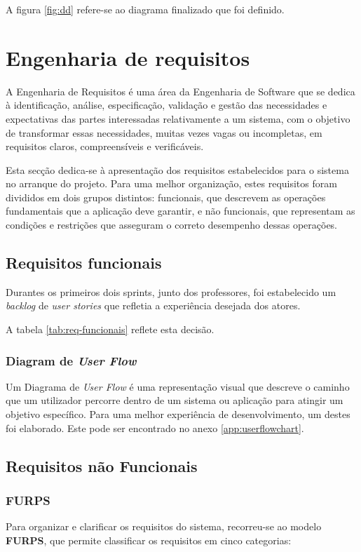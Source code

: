A figura \ref{fig:dd} refere-se ao diagrama finalizado que foi definido.

\section{Engenharia de requisitos}

A Engenharia de Requisitos é uma área da Engenharia de Software que se dedica à identificação, análise, especificação, validação e gestão das necessidades e expectativas das partes interessadas relativamente a um sistema, com o objetivo de transformar essas necessidades, muitas vezes vagas ou incompletas, em requisitos claros, compreensíveis e verificáveis.

Esta secção dedica-se à apresentação dos requisitos estabelecidos para o sistema no arranque do projeto. 
Para uma melhor organização, estes requisitos foram divididos em dois grupos distintos: funcionais, que descrevem as operações fundamentais que a aplicação deve garantir, e não funcionais, que representam as condições e restrições que asseguram o correto desempenho dessas operações.


\subsection{Requisitos funcionais}
\label{subsection:requisitos_funcionais}

Durantes os primeiros dois sprints, junto dos professores, foi estabelecido um \textit{backlog} de \textit{user stories} que refletia a experiência desejada dos atores. 

A tabela \ref{tab:req-funcionais} reflete esta decisão.
\subsubsection{Diagram de \textit{User Flow}}

Um Diagrama de \textit{User Flow} é uma representação visual que descreve o caminho que um utilizador percorre dentro de um sistema ou aplicação para atingir um objetivo específico. Para uma melhor experiência de desenvolvimento, um destes foi elaborado. Este pode ser encontrado no anexo \ref{app:userflowchart}.    

\subsection{Requisitos não Funcionais}

\subsubsection{FURPS}
Para organizar e clarificar os requisitos do sistema, recorreu-se ao modelo \textbf{FURPS}, que permite classificar os requisitos em cinco categorias: 

